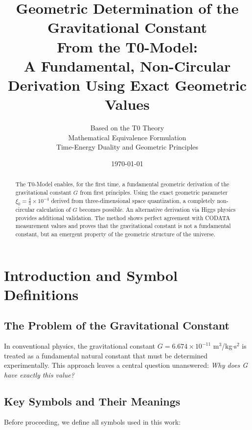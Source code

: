 \documentclass[12pt,a4paper]{article}
\title{\Huge\textbf{Geometric Determination of the Gravitational Constant}\\
	\Large From the T0-Model: \\
	A Fundamental, Non-Circular Derivation Using Exact Geometric Values}
\author{Based on the T0 Theory\\
	Mathematical Equivalence Formulation\\
	Time-Energy Duality and Geometric Principles}
\date{\today}
\theoremstyle{definition}
\begin{document}
	
	\maketitle
	
	\begin{abstract}
		The T0-Model enables, for the first time, a fundamental geometric derivation of the gravitational constant $G$ from first principles. Using the exact geometric parameter $\xi_0 = \frac{4}{3} \times 10^{-4}$ derived from three-dimensional space quantization, a completely non-circular calculation of $G$ becomes possible. An alternative derivation via Higgs physics provides additional validation. The method shows perfect agreement with CODATA measurement values and proves that the gravitational constant is not a fundamental constant, but an emergent property of the geometric structure of the universe.
	\end{abstract}
	
	\tableofcontents
	\newpage
	
	\section{Introduction and Symbol Definitions}
	
	\subsection{The Problem of the Gravitational Constant}
	
	In conventional physics, the gravitational constant $G = 6.674 \times 10^{-11}$ m$^3$/kg$\cdot$s$^2$ is treated as a fundamental natural constant that must be determined experimentally. This approach leaves a central question unanswered: \textit{Why does G have exactly this value?}
	
	\subsection{Key Symbols and Their Meanings}
	
	Before proceeding, we define all symbols used in this work:
	
\end{document}
